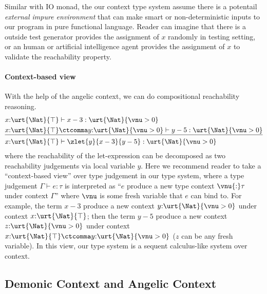 Similar with IO monad, the our context type system assume there is a potentail \emph{external impure environment} that can make smart or non-deterministic inputs to our program in pure functional language.
Reader can imagine that there is a outside test generator provides the assignment of $x$ randomly in testing setting, or an human or artificial intelligence agent provides the assignment of $x$ to validate the reachability property. 

\paragraph{Context-based view} With the help of the angelic context, we can do compositional reachability reasoning.
\begin{align*}
  &x{:}\urt{\Nat}{\top} \vdash x - 3 : \urt{\Nat}{\vnu > 0}
  \\&\underline{x{:}\urt{\Nat}{\top} \ctcomma y{:}\urt{\Nat}{\vnu > 0} \vdash y - 5 : \urt{\Nat}{\vnu > 0}}
  \\&x{:}\urt{\Nat}{\top} \vdash \zlet{y}{x - 3}{y - 5} : \urt{\Nat}{\vnu > 0}
\end{align*}\noindent
where the reachability of the let-expression can be decomposed as two reachability judgements via local variable $y$. Here we recommend reader to take a ``context-based view'' over type judgement in our type system, where a type judgement $\Gamma \vdash e : \tau$ is interpreted as ``$e$ produce a new type context $\vnu{:}\tau$ under context $\Gamma$'' where $\vnu$ is some fresh variable that $e$ can bind to. For example, the term $x - 3$ produce a new context $y{:}\urt{\Nat}{\vnu > 0}$ under context $x{:}\urt{\Nat}{\top}$; then the term $y - 5$ produce a new context $z{:}\urt{\Nat}{\vnu > 0}$ under context $x{:}\urt{\Nat}{\top} \ctcomma y{:}\urt{\Nat}{\vnu > 0}$ ($z$ can be any fresh variable). In this view, our type system is a sequent calculus-like system over context.

\subsection{Demonic Context and Angelic Context}

